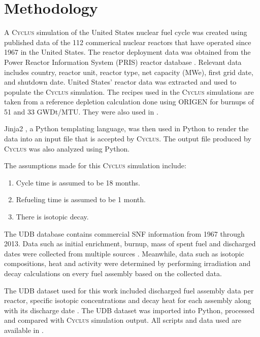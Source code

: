 \documentclass{anstrans}
\newcommand{\Cyclus}{\textsc{Cyclus}\xspace}%
\begin{document}
\section{Methodology}
A \Cyclus simulation of the United States nuclear fuel cycle was created using 
published data of the 112 commerical nuclear reactors that have operated since 
1967 in the United States. The reactor deployment data was obtained from the 
Power Reactor Information System (PRIS) reactor database \cite{IAEA_pris_2017}. 
Relevant data includes country, reactor unit, reactor type, net capacity (MWe), 
first grid date, and shutdown date. United States' reactor data was extracted 
and used to populate the \Cyclus simulation. The recipes used in the \Cyclus 
simulations are taken from a reference depletion calculation done using ORIGEN 
\cite{bell_origen_1973} for burnups of 51 and 33 GWDt/MTU. They were also used 
in \cite{wilson_adoption_2009, bae_synergistic_2017}. 

Jinja2 \cite{ronacher_welcome_2018}, a Python templating language, was then 
used in Python to render the data into an input file that is accepted by 
\Cyclus. The output file produced by \Cyclus was also analyzed using Python. 

The assumptions made for this \Cyclus simulation include: 

\begin{enumerate}[topsep=0pt,itemsep=-1ex,partopsep=1ex,parsep=1ex]
	\item Cycle time is assumed to be 18 months. 
	\item Refueling time is assumed to be 1 month. 
	\item There is isotopic decay. 
\end{enumerate}

The UDB database contains commercial SNF information from 1967 through 2013. 
Data such as initial enrichment, burnup, mass of spent fuel and discharged 
dates were collected from multiple sources \cite{peterson_additional_2017}. 
Meanwhile, data such as isotopic compositions, heat and activity were determined 
by performing irradiation and decay calculations on every fuel assembly based 
on the collected data. 

The UDB dataset used for this work included discharged fuel assembly data per 
reactor, specific isotopic concentrations and decay heat for each assembly 
along with its discharge date \cite{peterson_unf-st&dards_2017}. The UDB 
dataset was imported into Python, processed and compared with \Cyclus 
simulation output. All scripts and data used are available in 
\cite{chee_arfc/transition-scenarios_2018}. 
\end{document}
